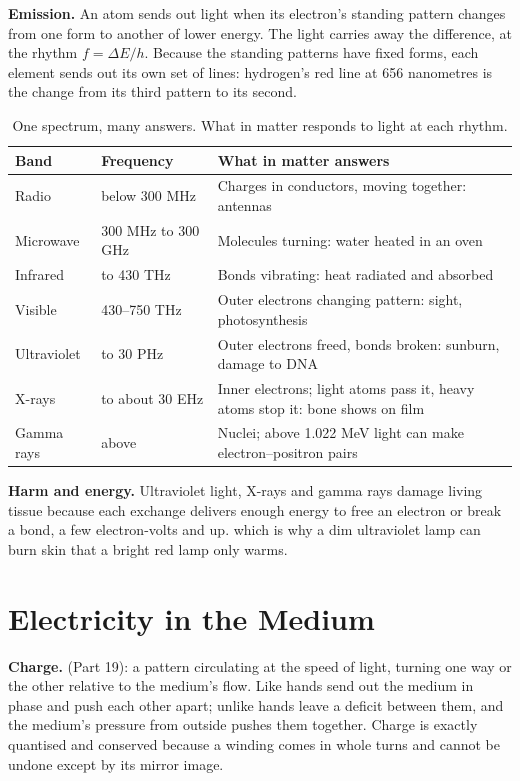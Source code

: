 \textbf{Emission.} An atom sends out light when its electron's standing pattern changes from one form to another of lower energy. The light carries away the difference, at the rhythm $f = \Delta E/h$. Because the standing patterns have fixed forms, each element sends out its own set of lines: hydrogen's red line at 656 nanometres is the change from its third pattern to its second.

\begin{table}[h]\centering\small
\caption{One spectrum, many answers. What in matter responds to light at each rhythm.}
\begin{tabularx}{\linewidth}{@{}l l X@{}}\toprule
\textbf{Band} & \textbf{Frequency} & \textbf{What in matter answers}\\\midrule
Radio & below 300 MHz & Charges in conductors, moving together: antennas\\
Microwave & 300 MHz to 300 GHz & Molecules turning: water heated in an oven\\
Infrared & to 430 THz & Bonds vibrating: heat radiated and absorbed\\
Visible & 430--750 THz & Outer electrons changing pattern: sight, photosynthesis\\
Ultraviolet & to 30 PHz & Outer electrons freed, bonds broken: sunburn, damage to DNA\\
X-rays & to about 30 EHz & Inner electrons; light atoms pass it, heavy atoms stop it: bone shows on film\\
Gamma rays & above & Nuclei; above 1.022 MeV light can make electron--positron pairs\\\bottomrule
\end{tabularx}\label{tab:spectrum}\end{table}

\textbf{Harm and energy.} Ultraviolet light, X-rays and gamma rays damage living tissue because each exchange delivers enough energy to free an electron or break a bond, a few electron-volts and up.  which is why a dim ultraviolet lamp can burn skin that a bright red lamp only warms.

\section{Electricity in the Medium}

\textbf{Charge.}  (Part 19): a pattern circulating at the speed of light, turning one way or the other relative to the medium's flow. Like hands send out the medium in phase and push each other apart; unlike hands leave a deficit between them, and the medium's pressure from outside pushes them together. Charge is exactly quantised and conserved because a winding comes in whole turns and cannot be undone except by its mirror image.

